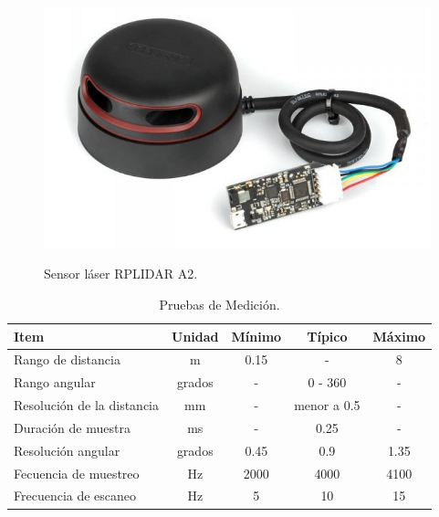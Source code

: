 \begin{figure}%
	\centering \footnotesize
 	{\includegraphics[width=0.60\linewidth]{images/rplidar.JPG}}
 	\captionsetup{font=footnotesize}
 	\caption{Sensor láser RPLIDAR A2.}
 	\label{f:lidar}
\end{figure}

\begin{table}[htbp]
\begin{center}
\begin{tabular}{|l|c|c|c|c|}
	\hline
	Item & Unidad & M\'inimo & T\'ipico & M\'aximo\\
	\hline \hline
	Rango de distancia & m & 0.15 & - & 8 \\ \hline
	Rango angular & grados & - & 0 - 360 & - \\ \hline
	Resoluci\'on de la distancia & mm & - & menor a 0.5 & - \\ \hline
	Duraci\'on de muestra & ms & - & 0.25 & - \\ \hline
	Resoluci\'on angular & grados & 0.45 & 0.9 & 1.35 \\ \hline
	Fecuencia de muestreo & Hz & 2000 & 4000 & 4100 \\ \hline
	Frecuencia de escaneo & Hz & 5 & 10 & 15 \\ \hline
\end{tabular}
	\caption{Pruebas de Medici\'on.}
	\label{tbl:medicion}
\end{center}
\end{table}

